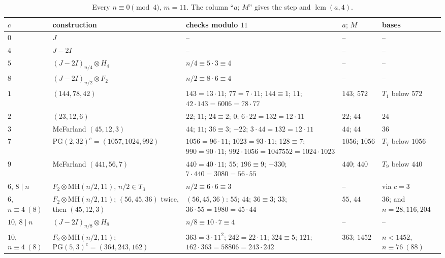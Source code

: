 \documentclass[10pt]{article}
\theoremstyle{remark}
\newcommand{\MH}{\mathrm{MH}}
\newcommand{\PG}{\mathrm{PG}}
\begin{document}
\begin{table}[t]
\footnotesize
\setlength{\tabcolsep}{4pt}
\renewcommand{\arraystretch}{1.15}
\caption{Every $n\equiv0\pmod 4$, $m=11$. The column ``$a;\,M$'' gives the step and $\operatorname{lcm}(a,4)$.}\label{tab:11}
\begin{tabular}{@{}>{\raggedright}p{1.6cm}>{\raggedright}p{3.6cm}>{\raggedright}p{6.1cm}>{\raggedright}p{1.45cm}>{\raggedright\arraybackslash}p{2.75cm}@{}}
$c$ & construction & checks modulo $11$ & $a;\,M$ & bases\\ \hline
$0$ & $J$ & -- & -- & --\\
$4$ & $J-2I$ & -- & -- & --\\
$5$ & $(J-2I)_{n/4}\otimes H_4$ & $n/4\equiv5\cdot3\equiv4$ & -- & --\\
$8$ & $(J-2I)_{n/2}\otimes F_2$ & $n/2\equiv8\cdot6\equiv4$ & -- & --\\
$1$ & $(144,78,42)$ & $143=13\cdot11$; $77=7\cdot11$; $144\equiv1$; $11$; $42\cdot143=6006=78\cdot77$ & $143;\,572$ & $T_1$ below $572$\\
$2$ & $(23,12,6)$ & $22$; $11$; $24\equiv2$; $0$; $6\cdot22=132=12\cdot11$ & $22;\,44$ & $24$\\
$3$ & McFarland $(45,12,3)$ & $44$; $11$; $36\equiv3$; $-22$; $3\cdot44=132=12\cdot11$ & $44;\,44$ & $36$\\
$7$ & $\PG(2,32)^c=(1057,1024,992)$ & $1056=96\cdot11$; $1023=93\cdot11$; $128\equiv7$; $990=90\cdot11$; $992\cdot1056=1047552=1024\cdot1023$ & $1056;\,1056$ & $T_7$ below $1056$\\
$9$ & McFarland $(441,56,7)$ & $440=40\cdot11$; $55$; $196\equiv9$; $-330$; $7\cdot440=3080=56\cdot55$ & $440;\,440$ & $T_9$ below $440$\\
$6$, $8\mid n$ & $F_2\otimes\MH(n/2,11)$, $n/2\in T_3$ & $n/2\equiv6\cdot6\equiv3$ & -- & via $c=3$\\
$6$, $n\equiv4\ (8)$ & $F_2\otimes\MH(n/2,11)$; $(56,45,36)$ twice, then $(45,12,3)$ & $(56,45,36)$: $55$; $44$; $36\equiv3$; $33$; $36\cdot55=1980=45\cdot44$ & $55$, $44$ & $36$; and $n=28,116,204$\\
$10$, $8\mid n$ & $(J-2I)_{n/8}\otimes H_8$ & $n/8\equiv10\cdot7\equiv4$ & -- & --\\
$10$, $n\equiv4\ (8)$ & $F_2\otimes\MH(n/2,11)$; $\PG(5,3)^c=(364,243,162)$ & $363=3\cdot11^2$; $242=22\cdot11$; $324\equiv5$; $121$; $162\cdot363=58806=243\cdot242$ & $363;\,1452$ & $n<1452$, $n\equiv76\ (88)$\\
\end{tabular}
\end{table}
\end{document}
